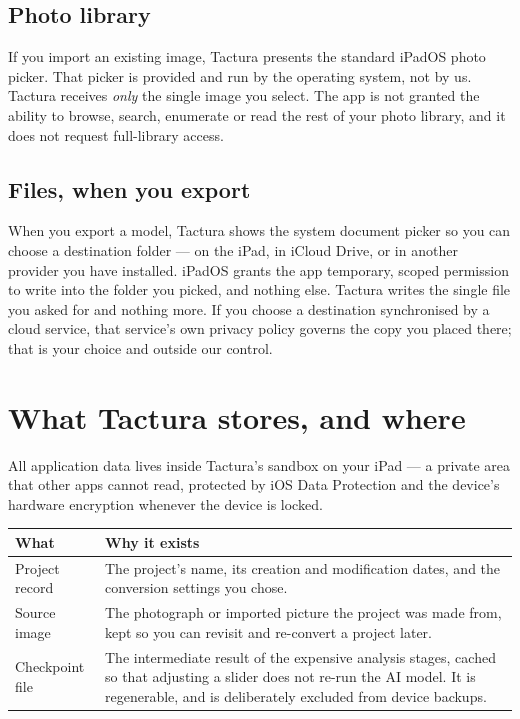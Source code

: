 \documentclass[11pt]{article}
\begin{document}
\subsection{Photo library}
If you import an existing image, Tactura presents the standard iPadOS photo picker.
That picker is provided and run by the operating system, not by us. Tactura receives
\emph{only} the single image you select. The app is not granted the ability to browse,
search, enumerate or read the rest of your photo library, and it does not request
full-library access.

\subsection{Files, when you export}
When you export a model, Tactura shows the system document picker so you can choose a
destination folder — on the iPad, in iCloud Drive, or in another provider you have
installed. iPadOS grants the app temporary, scoped permission to write into the folder
you picked, and nothing else. Tactura writes the single file you asked for and nothing
more. If you choose a destination synchronised by a cloud service, that service's own
privacy policy governs the copy you placed there; that is your choice and outside our
control.

\section{What Tactura stores, and where}

All application data lives inside Tactura's sandbox on your iPad — a private area
that other apps cannot read, protected by iOS Data Protection and the device's
hardware encryption whenever the device is locked.

\begin{plainbox}
\uifont\small
\begin{tabular}{@{}p{}p{}@{}}
\toprule
\textbf{What} & \textbf{Why it exists} \\
\midrule
Project record   & The project's name, its creation and modification dates, and the
                   conversion settings you chose. \\
Source image     & The photograph or imported picture the project was made from, kept
                   so you can revisit and re-convert a project later. \\
Checkpoint file  & The intermediate result of the expensive analysis stages, cached so
                   that adjusting a slider does not re-run the AI model. It is
                   regenerable, and is deliberately excluded from device backups. \\
\bottomrule
\end{tabular}
\end{plainbox}
\end{document}

